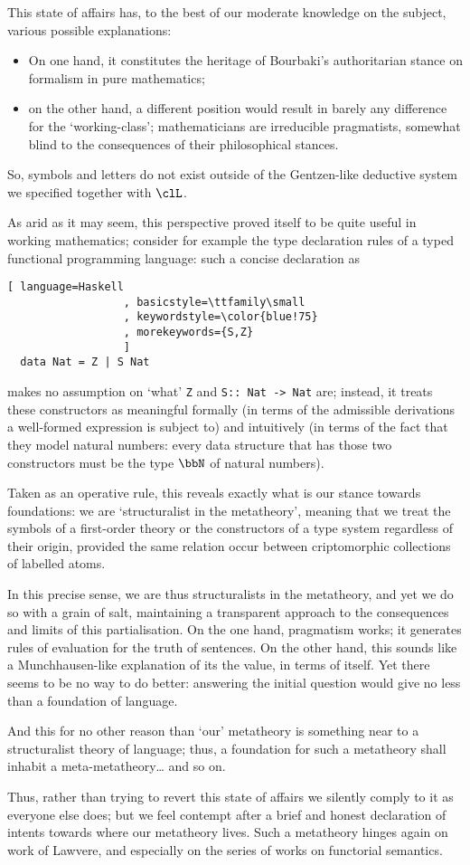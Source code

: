This state of affairs has, to the best of our moderate knowledge on the subject, various possible explanations:
\begin{itemize}
    \item On one hand, it constitutes the heritage of Bourbaki's authoritarian stance on formalism in pure mathematics;
    \item on the other hand, a different position would result in barely any difference for the `working-class'; mathematicians are irreducible pragmatists, somewhat blind to the consequences of their philosophical stances.
\end{itemize}
So, symbols and letters do not exist outside of the Gentzen-like deductive system we specified together with $\clL$.

As arid as it may seem, this perspective proved itself to be quite useful in working mathematics; consider for example the type declaration rules of a typed functional programming language: such a concise declaration as
\begin{lstlisting}[ language=Haskell
                  , basicstyle=\ttfamily\small
                  , keywordstyle=\color{blue!75}
                  , morekeywords={S,Z}
                  ]
  data Nat = Z | S Nat
\end{lstlisting}
makes no assumption on `what' \verb|Z| and \verb|S:: Nat -> Nat| are; instead, it treats these constructors as meaningful formally (in terms of the admissible derivations a well-formed expression is subject to) and intuitively (in terms of the fact that they model natural numbers: every data structure that has those two constructors must be the type $\bbN$ of natural numbers).

Taken as an operative rule, this reveals exactly what is our stance towards foundations: we are `structuralist in the metatheory', meaning that we treat the symbols of a first-order theory or the constructors of a type system regardless of their origin, provided the same relation occur between criptomorphic collections of labelled atoms.

In this precise sense, we are thus structuralists in the metatheory, and yet we do so with a grain of salt, maintaining a transparent approach to the consequences and limits of this partialisation. On the one hand, pragmatism works; it generates rules of evaluation for the truth of sentences. On the other hand, this sounds like a Munchhausen-like explanation of its the value, in terms of itself. Yet there seems to be no way to do better: answering the initial question would give no less than a foundation of language.

And this for no other reason than `our' metatheory is something near to a structuralist theory of language; thus, a foundation for such a metatheory shall inhabit a meta-metatheory\dots{} and so on.

Thus, rather than trying to revert this state of affairs we silently comply to it as everyone else does; but we feel contempt after a brief and honest declaration of intents towards where our metatheory lives. Such a metatheory hinges again on work of Lawvere, and especially on the series of works on functorial semantics.
